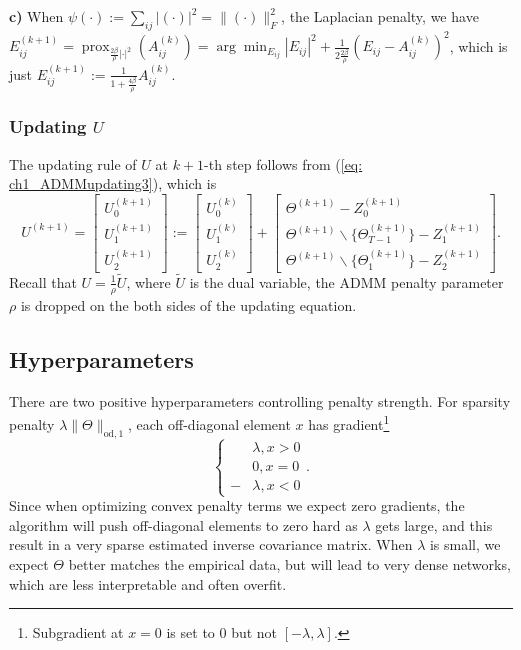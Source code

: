 \textbf{c)} When $\psi(\cdot):=\sum_{ij}|(\cdot)|^2=\|(\cdot)\|^2_F$, the Laplacian penalty, 
we have $E^{(k+1)}_{ij}=\operatorname{prox}_{\frac{2\beta}{\rho}|\cdot|^2}(A^{(k)}_{ij})=\arg\min_{E_{ij}}|E_{ij}|^2+\frac{1}{2\frac{2\beta}{\rho}}(E_{ij}-A^{(k)}_{ij})^2$, 
which is just $E^{(k+1)}_{ij}:=\frac{1}{1+\frac{4\beta}{\rho}}A^{(k)}_{ij}$.

\subsubsection{Updating $U$} 
The updating rule of $U$ at $k+1$-th step follows from (\ref{eq: ch1_ADMMupdating3}), 
which is
\begin{equation*}
    U^{(k+1)}=\begin{bmatrix}U^{(k+1)}_0\\U^{(k+1)}_1\\U^{(k+1)}_2\end{bmatrix}:=
    \begin{bmatrix}U^{(k)}_0\\U^{(k)}_1\\U^{(k)}_2\end{bmatrix} + 
    \begin{bmatrix}
        \Theta^{(k+1)}-Z^{(k+1)}_0 \\
        \Theta^{(k+1)}\backslash\{\Theta^{(k+1)}_{T-1}\}-Z^{(k+1)}_1 \\
        \Theta^{(k+1)}\backslash\{\Theta^{(k+1)}_1\}-Z^{(k+1)}_2
    \end{bmatrix}.
\end{equation*}
Recall that $U=\frac{1}{\rho}\tilde{U}$, where $\tilde{U}$ is the dual variable, 
the ADMM penalty parameter $\rho$ is dropped on the both sides of the updating equation. 

\subsection{Hyperparameters}
\label{subsec: hyperparameters}
There are two positive hyperparameters controlling penalty strength. 
For sparsity penalty $\lambda\|\Theta\|_{\text{od}, 1}$, 
each off-diagonal element $x$ has gradient\footnote{Subgradient at $x=0$ is set to 0 but not $[-\lambda,\lambda]$.}
\begin{equation*}
    \left\{\begin{aligned}
        &\lambda, x>0 \\
        &0, x=0 \\
        -&\lambda, x<0
    \end{aligned}\right..
\end{equation*}
Since when optimizing convex penalty terms we expect zero gradients, 
the algorithm will push off-diagonal elements to zero hard as $\lambda$ gets large, 
and this result in a very sparse estimated inverse covariance matrix. 
When $\lambda$ is small, we expect $\Theta$ better matches the empirical data, 
but will lead to very dense networks, 
which are less interpretable and often overfit. 

